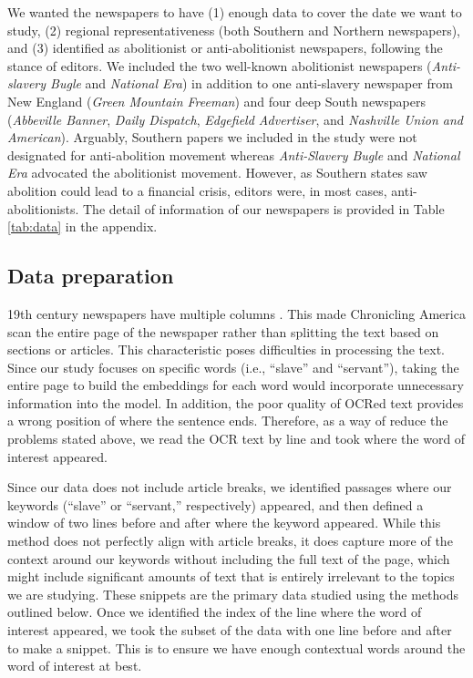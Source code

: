 \documentclass[11pt]{article}
\begin{document}
We wanted the newspapers to have (1) enough data to cover the date we want to study, (2) regional representativeness (both Southern and Northern newspapers), and (3) identified as abolitionist or anti-abolitionist newspapers, following the stance of editors.  
We included the two well-known abolitionist newspapers (\textit{Anti-slavery Bugle} and \textit{National Era}) in addition to one anti-slavery newspaper from New England (\textit{Green Mountain Freeman}) and four deep South newspapers (\textit{Abbeville Banner}, \textit{Daily Dispatch}, \textit{Edgefield Advertiser}, and \textit{Nashville Union and American}). 
Arguably, Southern papers we included in the study were not designated for anti-abolition movement whereas \textit{Anti-Slavery Bugle} and \textit{National Era} advocated the abolitionist movement. 
However, as Southern states saw abolition could lead to a financial crisis, editors were, in most cases, anti-abolitionists. 
The detail of information of our newspapers is provided in Table \ref{tab:data} in the appendix.

\subsection{Data preparation} \label{data preparation}
19th century newspapers have multiple columns \citep{smith_computational_2015}.
This made Chronicling America scan the entire page of the newspaper rather than splitting the text based on sections or articles. 
This characteristic poses difficulties in processing the text. 
Since our study focuses on specific words (i.e., ``slave'' and ``servant''),
taking the entire page to build the embeddings for each word would incorporate unnecessary information into the model. 
In addition, the poor quality of OCRed text provides a wrong position of where the sentence ends. Therefore, as a way of reduce the problems stated above, we read the OCR text by line and took where the word of interest appeared.

Since our data does not include article breaks, we identified passages where our keywords (``slave'' or ``servant,'' respectively) appeared, and then defined a window of two lines before and after where the keyword appeared. 
While this method does not perfectly align with article breaks, it does capture more of the context around our keywords without including the full text of the page, which might include significant amounts of text that is entirely irrelevant to the topics we are studying. 
These snippets are the primary data studied using the methods outlined below. 
Once we identified the index of the line where the word of interest appeared, we took the subset of the data with one line before and after to make a snippet. 
This is to ensure we have enough contextual words around the word of interest at best. 
\end{document}
